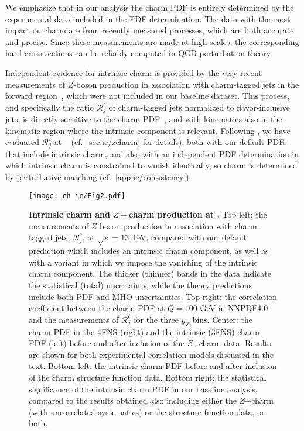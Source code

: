 We emphasize that in our analysis the charm PDF is entirely
determined by the experimental data included in the PDF determination.
The data with the most impact on charm are from recently measured \lhc
processes, which are both accurate and precise.
%
Since these measurements are made at high scales, the corresponding
hard cross-sections can be reliably computed in QCD perturbation theory.

Independent evidence for intrinsic charm
is provided by the very recent \lhcb measurements of $Z$-boson production
in association with charm-tagged jets in the forward
region~\cite{LHCb:2021stx}, which were not included in our baseline dataset.
%
This process, and specifically the ratio $\mathcal{R}_j^c$
of charm-tagged jets normalized to flavor-inclusive jets,
is directly sensitive to the charm PDF~\cite{Boettcher:2015sqn}, and
with \lhcb kinematics also
in the kinematic region  where the  intrinsic component is relevant.
%
Following \cite{Boettcher:2015sqn,LHCb:2021stx}, we have  evaluated
$\mathcal{R}_j^c$ at \nlo~\cite{Alioli:2010xd,Sjostrand:2007gs} (cf.\
\cref{sec:ic/zcharm} for details), both with our default PDFs that include
intrinsic charm, and also with an independent PDF determination in which
intrinsic charm is constrained to vanish  identically, so charm is determined
by perturbative matching (cf.\ \cref{app:ic/consistency}).

\begin{figure}[htbp]
  \begin{center}
    \texttt{[image: ch-ic/Fig2.pdf]}
     \caption{\small
       \textbf{ Intrinsic charm and $Z+$charm production at \lhcb.}
       Top left: the \lhcb measurements of $Z$ boson production
      in association with charm-tagged jets, $\mathcal{R}_j^c$, at $\sqrt{s}=13$ TeV,  compared with
      our default prediction which includes an intrinsic charm component,
      as well as with a variant in which we impose the
      vanishing of the intrinsic charm component.
       The thicker (thinner) bands in the \lhcb data indicate the statistical
      (total) uncertainty, while the theory predictions include both PDF and MHO uncertainties.
      Top right: the correlation coefficient between
     the  charm PDF at $Q=100$ GeV in NNPDF4.0
      and the \lhcb measurements of $\mathcal{R}_j^c$ 
     for the three $y_Z$ bins.
     Center: the charm PDF
     in the 4FNS (right) and the intrinsic (3FNS) charm PDF (left)
     before and after inclusion of the \lhcb $Z$+charm data.
     Results are shown
     for both experimental correlation models discussed in the text.
     Bottom left: the intrinsic charm PDF before and after inclusion
     of the \emc charm structure function data.
     Bottom right: the statistical significance of the
     intrinsic charm PDF in our baseline analysis, compared to the results
     obtained also including either the \lhcb $Z$+charm (with uncorrelated
     systematics) or the \emc
     structure function data, or both.
  \label{fig:ic/Zc} }
\end{center}
\end{figure}


